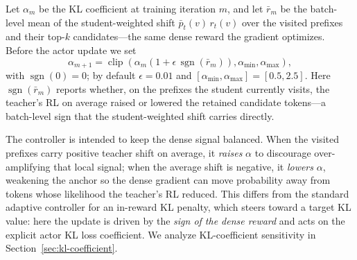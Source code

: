 Let $\alpha_m$ be the KL coefficient at training iteration $m$, and let
$\bar r_m$ be the batch-level mean of the student-weighted shift
$\bar p_t(v)\,r_t(v)$ over the visited prefixes and their top-$k$ candidates---the
same dense reward the gradient optimizes. Before the actor update we set
\begin{equation}
    \alpha_{m+1}
    =
    \operatorname{clip}
    \left(
    \alpha_m
    \left(1 + \epsilon\,\operatorname{sgn}(\bar r_m)\right),
    \alpha_{\min},
    \alpha_{\max}
    \right),
    \label{eq:adaptive-kl}
\end{equation}
with $\operatorname{sgn}(0)=0$; by default $\epsilon=0.01$ and
$[\alpha_{\min},\alpha_{\max}]=[0.5,2.5]$. Here $\operatorname{sgn}(\bar r_m)$
reports whether, on the prefixes the student currently visits, the teacher's RL
on average raised or lowered the retained candidate tokens---a batch-level sign
that the student-weighted shift carries directly.

The controller is intended to keep the dense signal balanced. When the visited
prefixes carry positive teacher shift on average, it \emph{raises} $\alpha$ to
discourage over-amplifying that local signal; when the average shift is
negative, it \emph{lowers} $\alpha$, weakening the anchor so the dense gradient
can move probability away from tokens whose likelihood the teacher's RL reduced.
This differs from the standard adaptive controller for an in-reward KL penalty,
which steers toward a target KL value: here the update is driven by the
\emph{sign of the \method{} dense reward} and acts on the explicit actor KL loss
coefficient. We analyze KL-coefficient sensitivity in
Section~\ref{sec:kl-coefficient}.




